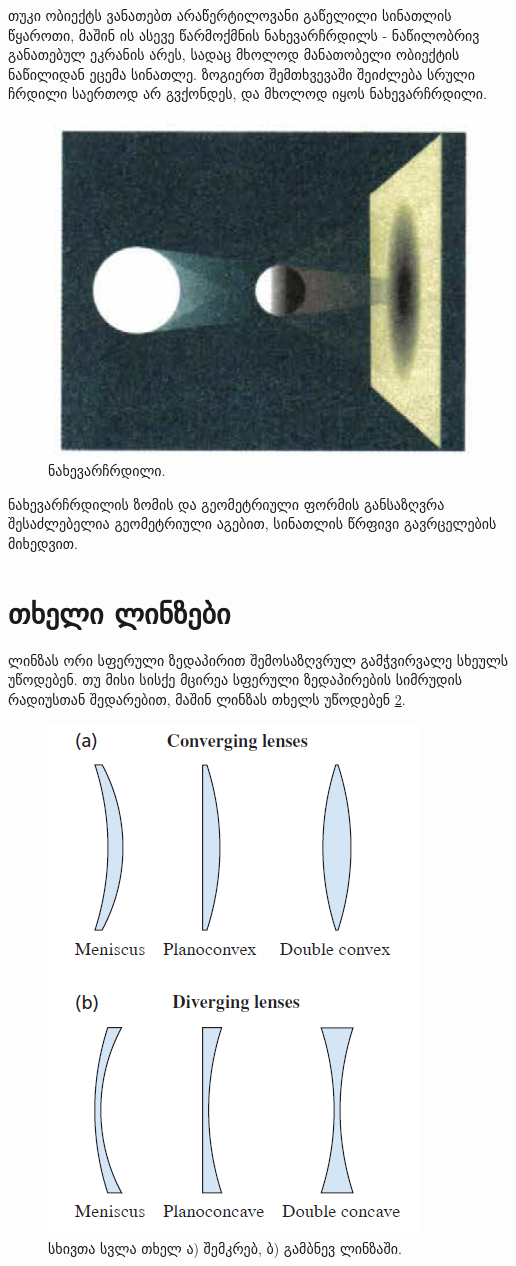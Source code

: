 \documentclass[a4paper]{book}
\begin{document}
თუკი ობიექტს ვანათებთ არაწერტილოვანი გაწელილი სინათლის წყაროთი, მაშინ ის ასევე წარმოქმნის ნახევარჩრდილს - ნაწილობრივ განათებულ ეკრანის არეს, სადაც მხოლოდ მანათობელი ობიექტის ნაწილიდან ეცემა სინათლე. ზოგიერთ შემთხვევაში შეიძლება სრული ჩრდილი საერთოდ არ გვქონდეს, და მხოლოდ იყოს ნახევარჩრდილი.
		\begin{figure}[H]
		   \centering
           \includegraphics[width=0.3\columnwidth]{figures/penumbra}
           \caption{ნახევარჩრდილი.}
           \label{fig:penumbra}
        \end{figure}
        
ნახევარჩრდილის ზომის და გეომეტრიული ფორმის განსაზღვრა შესაძლებელია გეომეტრიული აგებით, სინათლის წრფივი გავრცელების მიხედვით.

\section{თხელი ლინზები} ლინზას ორი სფერული ზედაპირით შემოსაზღვრულ გამჭვირვალე სხეულს უწოდებენ. თუ მისი სისქე მცირეა სფერული ზედაპირების სიმრუდის რადიუსთან შედარებით, მაშინ ლინზას თხელს უწოდებენ \ref{fig:thin_lenses}.
		\begin{figure}[h]
		   \centering
           \includegraphics[width=0.4\columnwidth]{figures/thin_lenses}
           \caption{სხივთა სვლა თხელ ა) შემკრებ, ბ) გამბნევ ლინზაში.}
           \label{fig:thin_lenses}
        \end{figure}
\end{document}
